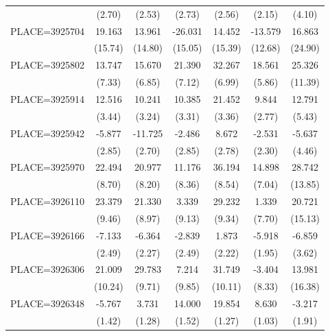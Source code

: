 {\begin{tabular}{l*{6}{c}}
                    &      (2.70)&      (2.53)&      (2.73)&      (2.56)&      (2.15)&      (4.10)\\
PLACE=3925704       &      19.163&      13.961&     -26.031&      14.452&     -13.579&      16.863\\
                    &     (15.74)&     (14.80)&     (15.05)&     (15.39)&     (12.68)&     (24.90)\\
PLACE=3925802       &      13.747&      15.670&      21.390&      32.267&      18.561&      25.326\\
                    &      (7.33)&      (6.85)&      (7.12)&      (6.99)&      (5.86)&     (11.39)\\
PLACE=3925914       &      12.516&      10.241&      10.385&      21.452&       9.844&      12.791\\
                    &      (3.44)&      (3.24)&      (3.31)&      (3.36)&      (2.77)&      (5.43)\\
PLACE=3925942       &      -5.877&     -11.725&      -2.486&       8.672&      -2.531&      -5.637\\
                    &      (2.85)&      (2.70)&      (2.85)&      (2.78)&      (2.30)&      (4.46)\\
PLACE=3925970       &      22.494&      20.977&      11.176&      36.194&      14.898&      28.742\\
                    &      (8.70)&      (8.20)&      (8.36)&      (8.54)&      (7.04)&     (13.85)\\
PLACE=3926110       &      23.379&      21.330&       3.339&      29.232&       1.339&      20.721\\
                    &      (9.46)&      (8.97)&      (9.13)&      (9.34)&      (7.70)&     (15.13)\\
PLACE=3926166       &      -7.133&      -6.364&      -2.839&       1.873&      -5.918&      -6.859\\
                    &      (2.49)&      (2.27)&      (2.49)&      (2.22)&      (1.95)&      (3.62)\\
PLACE=3926306       &      21.009&      29.783&       7.214&      31.749&      -3.404&      13.981\\
                    &     (10.24)&      (9.71)&      (9.85)&     (10.11)&      (8.33)&     (16.38)\\
PLACE=3926348       &      -5.767&       3.731&      14.000&      19.854&       8.630&      -3.217\\
                    &      (1.42)&      (1.28)&      (1.52)&      (1.27)&      (1.03)&      (1.91)\\

\end{tabular}}
